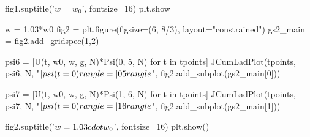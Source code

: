 \begin{python}
fig1.suptitle('$w = w_0$', fontsize=16)
plt.show

w = 1.03*w0
fig2 = plt.figure(figsize=(6, 8/3), layout="constrained")
gs2_main = fig2.add_gridspec(1,2)

psi6 = [U(t, w0, w, g, N)*Psi(0, 5, N) for t in tpoints]
JCumLadPlot(tpoints, psi6, N, "$|\\psi(t=0)\\rangle = |05 \\rangle$", fig2.add_subplot(gs2_main[0]))

psi7 = [U(t, w0, w, g, N)*Psi(1, 6, N) for t in tpoints]
JCumLadPlot(tpoints, psi7, N, "$|\\psi(t=0)\\rangle = |16 \\rangle$", fig2.add_subplot(gs2_main[1]))

fig2.suptitle('$w = 1.03\\cdot w_0$', fontsize=16)
plt.show()
\end{python}